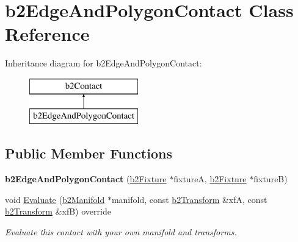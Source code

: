 \hypertarget{classb2_edge_and_polygon_contact}{}\section{b2\+Edge\+And\+Polygon\+Contact Class Reference}
\label{classb2_edge_and_polygon_contact}
Inheritance diagram for b2\+Edge\+And\+Polygon\+Contact\+:\begin{figure}[H]
\begin{center}
\leavevmode
\includegraphics[height=2.000000cm]{classb2_edge_and_polygon_contact}
\end{center}
\end{figure}
\subsection*{Public Member Functions}
\begin{DoxyCompactItemize}
\item 
\mbox{\label{classb2_edge_and_polygon_contact_a79d9b012c4a0df7d5c3dcecd33df7d5f}} 
{\bfseries b2\+Edge\+And\+Polygon\+Contact} (\hyperlink{classb2_fixture}{b2\+Fixture} $\ast$fixtureA, \hyperlink{classb2_fixture}{b2\+Fixture} $\ast$fixtureB)
\item 
\mbox{\label{classb2_edge_and_polygon_contact_ae99fba8c1cb7e5d7c11ab78ca80e775d}} 
void \hyperlink{classb2_edge_and_polygon_contact_ae99fba8c1cb7e5d7c11ab78ca80e775d}{Evaluate} (\hyperlink{structb2_manifold}{b2\+Manifold} $\ast$manifold, const \hyperlink{structb2_transform}{b2\+Transform} \&xfA, const \hyperlink{structb2_transform}{b2\+Transform} \&xfB) override
\begin{DoxyCompactList}\small\item\em Evaluate this contact with your own manifold and transforms. \end{DoxyCompactList}\end{DoxyCompactItemize}
